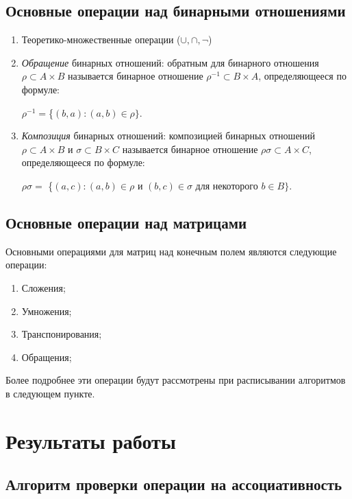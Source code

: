 \documentclass[bachelor, och, labwork]{shiza}
\begin{document}
\subsection{Основные операции над бинарными отношениями}

\begin{enumerate}
	\item Теоретико-множественные операции ($\cup, \cap, \neg$)
	\item \textit{Обращение} бинарных отношений: обратным для бинарного отношения $\rho \subset A \times B$ называется бинарное
	отношение $\rho^{-1} \subset B \times A$, определяющееся по формуле:

		$\rho^{-1} = $\{$(b, a) : (a, b) \in \rho \}$.

	\item \textit{Композиция} бинарных отношений: композицией бинарных отношений $\rho \subset A \times B$ и $\sigma \subset B \times C$
	называется бинарное отношение $\rho\sigma \subset A \times C$, определяющееся по формуле:

		$\rho\sigma = $ \{$(a, c) : (a, b) \in \rho \text{ и } (b, c) \in \sigma \text{ для некоторого } b \in B
		\}$.

\end{enumerate}
	
\subsection{Основные операции над матрицами}

	Основными операциями для матриц над конечным полем являются следующие операции: 
	\begin{enumerate}
	\item Сложения;
	\item Умножения;
	\item Транспонирования;
	\item Обращения;
	\end{enumerate}

	Более подробнее эти операции будут рассмотрены при расписывании алгоритмов в следующем пункте.
	\section{Результаты работы}
	
	\subsection{Алгоритм проверки операции на ассоциативность}
	
\end{document}
